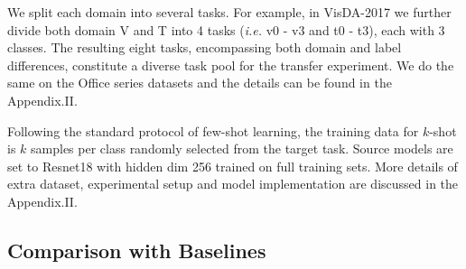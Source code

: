 \documentclass[letterpaper]{article} %
\begin{document}
We split each domain into several tasks. For example, in VisDA-2017 we further divide both domain V and T into 4 tasks (\textit{i.e.} v0 - v3 and t0 - t3), each with 3 classes. The resulting eight tasks, encompassing both domain and label differences, constitute a diverse task pool for the transfer experiment. 
We do the same on the Office series datasets and the details can be found in the Appendix.II.






Following the standard protocol of few-shot learning, the training data for $k$-shot is $k$ samples per class randomly selected from the target task. Source models are set to Resnet18 with hidden dim 256 trained on full training sets. More details of extra dataset, experimental setup and model implementation are discussed in the Appendix.II.



\subsection{Comparison with Baselines}
\end{document}
